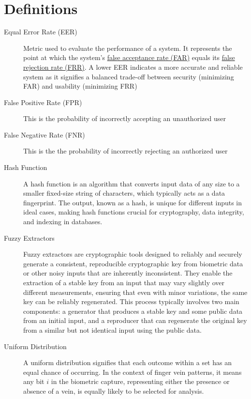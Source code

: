 \section{Definitions}
\begin{description}
    \item[Equal Error Rate (EER)] \label{def:EER} Metric used to evaluate the performance of a system. It represents the point at which the system's \hyperref[def:FAR]{false acceptance rate (FAR)} equals its \hyperref[def:FRR]{false rejection rate (FRR)}. A lower EER indicates a more accurate and reliable system as it signifies a balanced trade-off between security (minimizing FAR) and usability (minimizing FRR)

    \item[False Positive Rate (FPR)] \label{def:FPR} This is the probability of incorrectly accepting an unauthorized user

    \item[False Negative Rate (FNR)] \label{def:FNR} This is the the probability of incorrectly rejecting an authorized user

    \item[Hash Function] \label{def:Hash_Function} A hash function is an algorithm that converts input data of any size to a smaller fixed-size string of characters, which typically acts as a data fingerprint. The output, known as a hash, is unique for different inputs in ideal cases, making hash functions crucial for cryptography, data integrity, and indexing in databases.

    \item[Fuzzy Extractors] \label{def:Fuzzy_Extractors} Fuzzy extractors are cryptographic tools designed to reliably and securely generate a consistent, reproducible cryptographic key from biometric data or other noisy inputs that are inherently inconsistent. They enable the extraction of a stable key from an input that may vary slightly over different measurements, ensuring that even with minor variations, the same key can be reliably regenerated. This process typically involves two main components: a generator that produces a stable key and some public data from an initial input, and a reproducer that can regenerate the original key from a similar but not identical input using the public data.

    \item[Uniform Distribution] \label{def:Uniform Distribution} A uniform distribution signifies that each outcome within a set has an equal chance of occurring. In the context of finger vein patterns, it means any bit \(i\) in the biometric capture, representing either the presence or absence of a vein, is equally likely to be selected for analysis.


\end{description}
